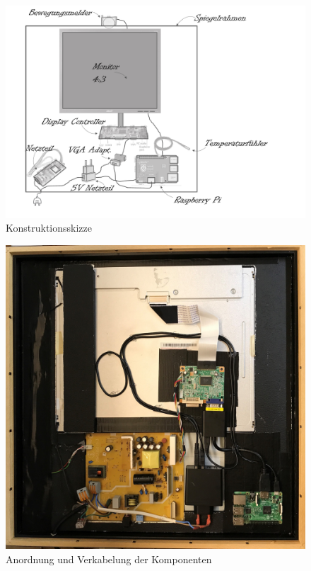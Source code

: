 \begin{figure}
	\includegraphics[scale=0.5, trim=0mm 10mm 60mm 10mm]{bilder/smartMirrorExplosionsskizze.pdf}
	\caption{Konstruktionsskizze}
\end{figure}
\begin{figure}[H]
	\includegraphics[scale=0.06]{bilder/Innenansicht.jpg}
	\caption{Anordnung und Verkabelung der Komponenten}
\end{figure}
